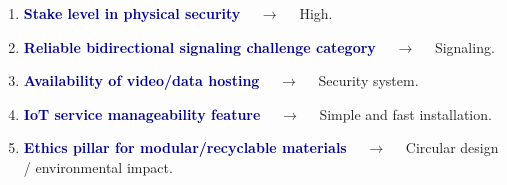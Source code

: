 \documentclass[11pt,a4paper]{article}
\begin{document}
\begin{enumerate}[label=\arabic*., leftmargin=*, labelsep=0.8em, itemsep=0.35em, parsep=0.1em, topsep=0.2em]
  \item \textcolor{darkblue}{\textbf{Stake level in physical security}} $\quad\to\quad$ High.
  \item \textcolor{darkblue}{\textbf{Reliable bidirectional signaling challenge category}} $\quad\to\quad$ Signaling.
  \item \textcolor{darkblue}{\textbf{Availability of video/data hosting}} $\quad\to\quad$ Security system.
  \item \textcolor{darkblue}{\textbf{IoT service manageability feature}} $\quad\to\quad$ Simple and fast installation.
  \item \textcolor{darkblue}{\textbf{Ethics pillar for modular/recyclable materials}} $\quad\to\quad$ Circular design / environmental impact.
\end{enumerate}
\end{document}
